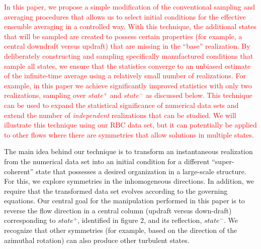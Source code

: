 \documentclass[twocolumn,10pt]{tsfp}
\begin{document}
 
\textcolor{red}{In this paper, we propose a simple modification of the conventional sampling and averaging procedures that allows us to select initial conditions for the effective ensemble averaging in a controlled way. With this technique, the additional states that will be sampled are created to possess certain properties (for example, a central downdraft versus updraft) that are missing in the ``base'' realization. By deliberately constructing and sampling specifically manufactured conditions that sample all states, we ensure that the statistics converge to an unbiased estimate of the infinite-time average using a relatively small number of realizations. For example, in this paper we achieve significantly improved statistics with only two realizations, sampling over $state^+$ and $state^-$ as discussed below. This technique can be used to expand the statistical significance of numerical data sets and extend the number of \textit{independent} realizations that can be studied. We will illustrate this technique using our RBC data set, but it can potentially be applied to other flows where there are symmetries that allow solutions in multiple states.} 

The main idea behind our technique is to transform an instantaneous realization from the numerical data set into an initial condition for a different ``super-coherent'' state that possesses a desired organization in a large-scale structure. For this, we explore symmetries in the inhomogeneous directions. In addition, we require that the transformed data set evolves according to the governing equations. Our central goal for the manipulation performed in this paper is to reverse the flow direction in a central column (updraft versus down-draft) corresponding to $state^+$, identified in figure 2, and its reflection, $state^-$. We recognize that other symmetries (for example, based on the direction of the azimuthal rotation) can also produce other turbulent states.
\end{document}
